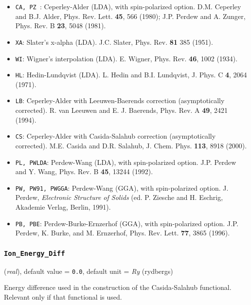 \documentclass{article}
\begin{document}
\begin{itemize}
\item {\tt CA, PZ }: Ceperley-Alder (LDA), with spin-polarized
  option. D.M. Ceperley and B.J. Alder, Phys. Rev. Lett. {\bf 45},
  566 (1980);  J.P. Perdew and A. Zunger, Phys. Rev. B {\bf 23}, 
5048 (1981).

\item {\tt XA}: Slater's x-alpha (LDA). J.C. Slater, Phys. Rev. {\bf 81} 385 (1951).

\item {\tt WI}: Wigner's interpolation (LDA). E. Wigner, Phys. Rev. {\bf 46},
  1002 (1934).

\item {\tt HL}: Hedin-Lundqvist (LDA). L. Hedin and B.I. Lundqvist,
  J. Phys. C {\bf 4}, 2064 (1971).

\item {\tt LB}: Ceperley-Alder with Leeuwen-Baerends correction
  (asymptotically corrected). R. van Leeuwen and E. J. Baerends,
  Phys. Rev. A {\bf 49}, 2421 (1994).

\item {\tt CS}: Ceperley-Alder with Casida-Salahub correction
  (asymptotically corrected). M.E. Casida and D.R. Salahub,
  J. Chem. Phys. {\bf 113}, 8918 (2000).

\item {\tt PL, PWLDA}: Perdew-Wang (LDA), with spin-polarized
  option. J.P. Perdew and Y. Wang, Phys. Rev. B {\bf 45}, 13244 (1992).

\item {\tt PW, PW91, PWGGA}: Perdew-Wang (GGA), with spin-polarized
  option. J. Perdew, {\it Electronic Structure of Solids}
  (ed. P. Ziesche and H. Eschrig, Akademie Verlag, Berlin, 1991).

\item {\tt PB, PBE}: Perdew-Burke-Ernzerhof (GGA), with spin-polarized
  option. J.P. Perdew, K. Burke, and M. Ernzerhof, Phys. Rev. Lett.
  {\bf 77}, 3865 (1996).
\end{itemize}

\subsubsection{\tt Ion\_Energy\_Diff 
\label{IonEnergyDiff}}
({\it real}),
default value = {\tt 0.0},
default unit = {\it Ry} (rydbergs)

Energy difference used in the construction of the Casida-Salahub functional.
Relevant only if that functional is used.
\end{document}
